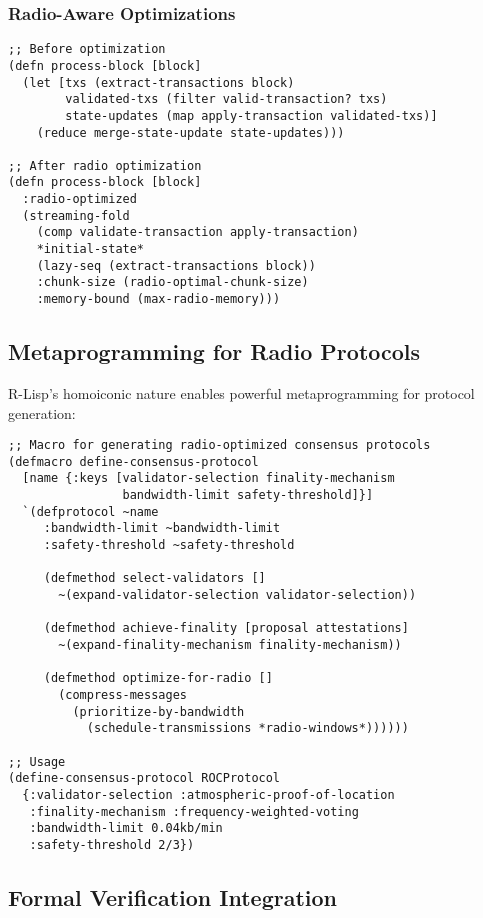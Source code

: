 \documentclass[11pt,a4paper]{article}
\begin{document}
\subsubsection{Radio-Aware Optimizations}

\begin{verbatim}
;; Before optimization
(defn process-block [block]
  (let [txs (extract-transactions block)
        validated-txs (filter valid-transaction? txs)
        state-updates (map apply-transaction validated-txs)]
    (reduce merge-state-update state-updates)))

;; After radio optimization
(defn process-block [block]
  :radio-optimized
  (streaming-fold 
    (comp validate-transaction apply-transaction)
    *initial-state*
    (lazy-seq (extract-transactions block))
    :chunk-size (radio-optimal-chunk-size)
    :memory-bound (max-radio-memory)))
\end{verbatim}

\subsection{Metaprogramming for Radio Protocols}

R-Lisp's homoiconic nature enables powerful metaprogramming for protocol generation:

\begin{verbatim}
;; Macro for generating radio-optimized consensus protocols
(defmacro define-consensus-protocol 
  [name {:keys [validator-selection finality-mechanism 
                bandwidth-limit safety-threshold]}]
  `(defprotocol ~name
     :bandwidth-limit ~bandwidth-limit
     :safety-threshold ~safety-threshold
     
     (defmethod select-validators []
       ~(expand-validator-selection validator-selection))
     
     (defmethod achieve-finality [proposal attestations]
       ~(expand-finality-mechanism finality-mechanism))
     
     (defmethod optimize-for-radio []
       (compress-messages 
         (prioritize-by-bandwidth
           (schedule-transmissions *radio-windows*))))))

;; Usage
(define-consensus-protocol ROCProtocol
  {:validator-selection :atmospheric-proof-of-location
   :finality-mechanism :frequency-weighted-voting
   :bandwidth-limit 0.04kb/min
   :safety-threshold 2/3})
\end{verbatim}

\subsection{Formal Verification Integration}
\end{document}
